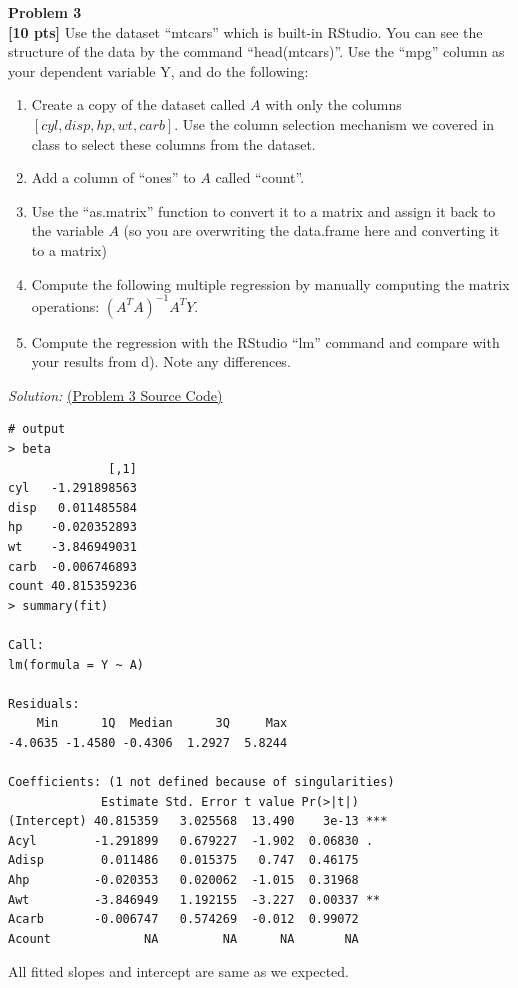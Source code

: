 \documentclass{article}
\newenvironment{problem}[2][Problem]
    { \begin{mdframed}[backgroundcolor=gray!20] \textbf{#1 #2} \\}
    {  \end{mdframed}}
\newenvironment{solution}
    {\textit{Solution:}}
    {}
\begin{document}
\newpage
\begin{problem}{3}
\textbf{[10 pts]}
Use the dataset “mtcars” which is built-in RStudio. You can see the structure of the data by the command “head(mtcars)”. Use the “mpg” column as your dependent variable Y, and do the following:
\begin{enumerate}
	\item Create a copy of the dataset called $A$ with only the columns $[cyl, disp, hp, wt, carb]$. Use the column selection mechanism we covered in class to select these columns from the dataset.
	\item Add a column of “ones” to $A$ called “count”.
	\item Use the “as.matrix” function to convert it to a matrix and assign it back to the variable $A$ (so you
are overwriting the data.frame here and converting it to a matrix)
	\item Compute the following multiple regression by manually computing the matrix operations:
	\newline
	$(A^TA)^{-1}A^TY$.
	\item Compute the regression with the RStudio “lm” command and compare with your results from d).
Note any differences.
\end{enumerate}
\end{problem}
\begin{solution}
\href{run:./src/p3.r}{ (Problem 3 Source Code)}
	\begin{lstlisting}
# output
> beta
              [,1]
cyl   -1.291898563
disp   0.011485584
hp    -0.020352893
wt    -3.846949031
carb  -0.006746893
count 40.815359236
> summary(fit)

Call:
lm(formula = Y ~ A)

Residuals:
    Min      1Q  Median      3Q     Max 
-4.0635 -1.4580 -0.4306  1.2927  5.8244 

Coefficients: (1 not defined because of singularities)
             Estimate Std. Error t value Pr(>|t|)    
(Intercept) 40.815359   3.025568  13.490    3e-13 ***
Acyl        -1.291899   0.679227  -1.902  0.06830 .  
Adisp        0.011486   0.015375   0.747  0.46175    
Ahp         -0.020353   0.020062  -1.015  0.31968    
Awt         -3.846949   1.192155  -3.227  0.00337 ** 
Acarb       -0.006747   0.574269  -0.012  0.99072    
Acount             NA         NA      NA       NA    
	\end{lstlisting}
All fitted slopes and intercept are same as we expected. 
\end{solution}
\end{document}
